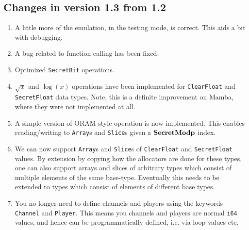 \subsection{Changes in version 1.3 from 1.2}
\begin{enumerate}
\item A little more of the emulation, in the testing mode, is correct.
      This aids a bit with debugging.
\item A bug related to function calling has been fixed.
\item Optimized \verb|SecretBit| operations.
\item $\sqrt{x}$ and $\log(x)$ operations have been implemented for \verb|ClearFloat|
	and \verb|SecretFloat| data types. Note, this is a definite
	improvement on Mamba, where they were not implemented at all.
\item A simple version of ORAM style operation is now implemented. This
	enables reading/writing to \verb|Array|s and \verb|Slice|s
	given a $\mathbf{SecretModp}$ index.
\item We can now support \verb|Array|s and \verb|Slice|s of 
	\verb|ClearFloat| and \verb|SecretFloat| values.
	By extension by copying how the allocators are done for
	these types, one can also support arrays and slices of
	arbitrary types which consist of multiple elements 
	of the same base-type.
	Eventually this needs to be extended to types which consist
	of elements of different base types.
\item You no longer need to define channels and players using the
      keywords \verb|Channel| and \verb|Player|. 
      This means you channels and players are normal \verb|i64| values,
      and hence can be programmatically defined, i.e. via loop values etc.
\end{enumerate}

